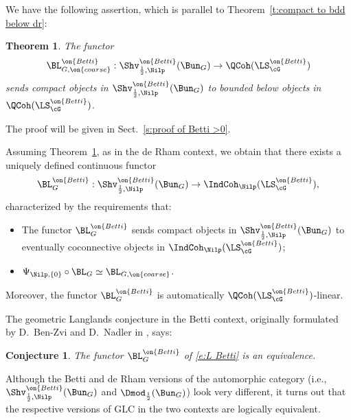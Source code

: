 \documentclass[9pt]{amsart}
\newtheorem{conj}[subsubsection]{Conjecture}
\newtheorem{thm}[subsubsection]{Theorem}
\theoremstyle{remark}
\theoremstyle{definition}
\theoremstyle{remark}
\newcommand{\thmref}[1]{Theorem~\ref{#1}}
\newcommand{\secref}[1]{Sect.~\ref{#1}}
\numberwithin{equation}{section}
\begin{document}
\sssec{}

We have the following assertion, which is parallel to \thmref{t:compact to bdd below dr}:

\begin{thm} \label{t:compact to bdd below Betti}
The functor
$$\BL^{\on{Betti}}_{G,\on{coarse}}:\Shv^{\on{Betti}}_{\frac{1}{2},\Nilp}(\Bun_G)\to \QCoh(\LS^{\on{Betti}}_\cG)$$
sends compact objects in $\Shv^{\on{Betti}}_{\frac{1}{2},\Nilp}(\Bun_G)$ to bounded below 
objects in $\QCoh(\LS^{\on{Betti}}_\cG)$.
\end{thm} 

The proof will be given in \secref{s:proof of Betti >0}. 

\sssec{}

Assuming \thmref{t:compact to bdd below Betti}, as in the de Rham context, we obtain that there exists a uniquely 
defined continuous functor
\begin{equation} \label{e:L Betti}
\BL^{\on{Betti}}_G:\Shv^{\on{Betti}}_{\frac{1}{2},\Nilp}(\Bun_G)\to \IndCoh_\Nilp(\LS^{\on{Betti}}_\cG),
\end{equation} 
characterized by the requirements that:

\begin{itemize}

\item The functor $\BL^{\on{Betti}}_G$ sends compact objects in $\Shv^{\on{Betti}}_{\frac{1}{2},\Nilp}(\Bun_G)$ to eventually coconnective
objects in $\IndCoh_\Nilp(\LS^{\on{Betti}}_\cG)$;

\item $\Psi_{\Nilp,\{0\}}\circ \BL_G\simeq \BL_{G,\on{coarse}}$.

\end{itemize} 

Moreover, the functor $\BL^{\on{Betti}}_G$ is automatically $\QCoh(\LS^{\on{Betti}}_\cG)$-linear.

\sssec{}

The geometric Langlands conjecture in the Betti context, originally formulated by D.~Ben-Zvi and D.~Nadler in \cite{BZN}, says:

\begin{conj} \label{c:GLC Betti}
The functor $\BL^{\on{Betti}}_G$ of \eqref{e:L Betti} is an equivalence.
\end{conj} 


Although the Betti and de Rham versions of the automorphic category (i.e., 
$\Shv^{\on{Betti}}_{\frac{1}{2},\Nilp}(\Bun_G)$ and $\Dmod_{\frac{1}{2}}(\Bun_G)$) look very different, it turns 
out that the respective versions of GLC in the two contexts are logically equivalent. 
\end{document}

